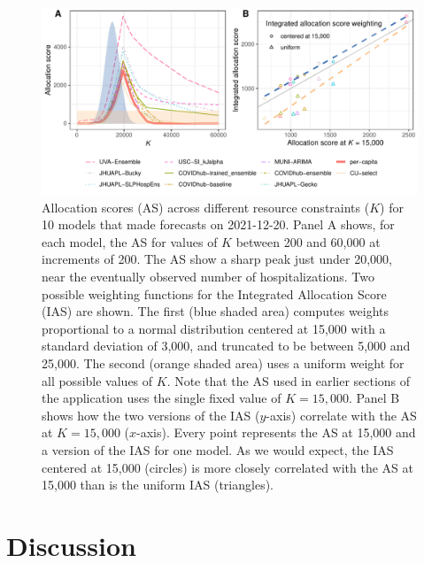 \documentclass{article}\usepackage[]{graphicx}\usepackage[]{xcolor}
\makeatletter
\def\maxwidth{ %
  \ifdim\Gin@nat@width>\linewidth
    \linewidth
  \else
    \Gin@nat@width
  \fi
}
\newenvironment{knitrout}{}{} %
\makeatother
\begin{document}
\begin{knitrout}
\color{fgcolor}\begin{figure}
\includegraphics[width=\maxwidth]{figure/multi-k-1} \caption[Allocation scores (AS) across different resource constraints ($K$) for 10 models that made forecasts on 2021-12-20]{Allocation scores (AS) across different resource constraints ($K$) for 10 models that made forecasts on 2021-12-20. Panel A shows, for each model, the AS for values of $K$ between 200 and 60,000 at increments of 200. The AS show a sharp peak just under 20,000, near the eventually observed number of hospitalizations. Two possible weighting functions for the Integrated Allocation Score (IAS) are shown. The first (blue shaded area) computes weights proportional to a normal distribution centered at 15,000 with a standard deviation of 3,000, and truncated to be between 5,000 and 25,000. The second (orange shaded area) uses a uniform weight for all possible values of $K$. Note that the AS used in earlier sections of the application uses the single fixed value of $K=15,000$.  Panel B shows how the two versions of the IAS ($y$-axis) correlate with the AS at $K=15,000$ ($x$-axis). Every point represents the AS at 15,000 and a version of the IAS for one model. As we would expect, the IAS centered at 15,000 (circles) is more closely correlated with the AS at 15,000 than is the uniform IAS (triangles).}\label{fig:multi-k}
\end{figure}

\end{knitrout}

\section{Discussion}
\label{sec:discussion}
\end{document}

